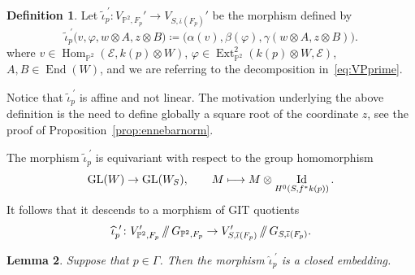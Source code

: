 \documentclass[11pt]{article}
\newcommand\mto{\mathchoice{\longmapsto}{\mapsto}{\mapsto}{\mapsto}}
\providecommand\sslash{\mathop{/\mkern-5.5mu/}}
\newcommand{\PP}{{\mathbb P}}\let\P\PP
\newcommand\cE{\mathcal{E}}
\DeclareMathOperator{\End}{End}
\DeclareMathOperator{\Ext}{Ext}
\DeclareMathOperator{\GL}{GL}
\DeclareMathOperator{\Hom}{Hom}
\DeclareMathOperator{\Id}{Id}
\let\phi\varphi
\newtheorem{lemm}{Lemma}[section]
\theoremstyle{definition}
\newtheorem{defi}[lemm]{Definition}
\begin{document}
\begin{defi}
Let $\widetilde{\iota}_p^{\ \prime}\colon V_{\PP^2,F_p}'\to V_{S,\overline{\iota}(F_p)}'$ be the morphism defined by
\begin{equation}\label{eq:DefOfIotaTilde2}
\widetilde{\iota}_p^{\ \prime}
\bigl(v,\phi,w\otimes A,z\otimes B\bigr) \coloneqq \bigl(\alpha(v),\beta(\phi), \gamma(w\otimes A,z\otimes B)\bigr).
\end{equation}
where $v\in\Hom_{\PP^2}(\cE,k(p)\otimes W)$, $\phi\in\Ext^2_{\PP^2}(k(p)\otimes W,\cE)$, $A,B\in\End(W)$, and we are referring
to the decomposition in~\eqref{eq:VPprime}.
\end{defi}

Notice that $\widetilde{\iota}_p^{\ \prime}$ is affine and not linear.
The motivation underlying the above definition is the need to define globally a square root of the coordinate $z$, see the proof of Proposition~\ref{prop:ennebarnorm}.

The morphism $\widetilde{\iota}_p^{\ \prime}$ is equivariant with respect to the group homomorphism
\[
\GL(W) \to \GL(W_S), \qquad M\mto M\otimes\Id_{H^0(S,f^*k(p))}.
\]
It follows that it descends to a morphism of GIT quotients
\[
\widehat{\iota}_p^{\ \prime}\colon V_{\PP^2,F_p}'\sslash G_{\P^2,F_p} \to V_{S,\overline{\iota}(F_p)}'\sslash G_{S,\overline{\iota}(F_p)}.
\]

\begin{lemm}\label{lem:PointIsInGamma}
Suppose that $p\in\mathsf{\Gamma}$.
Then the morphism $\widehat{\iota}_p^{\ \prime}$ is a closed embedding.
\end{lemm}
\end{document}
